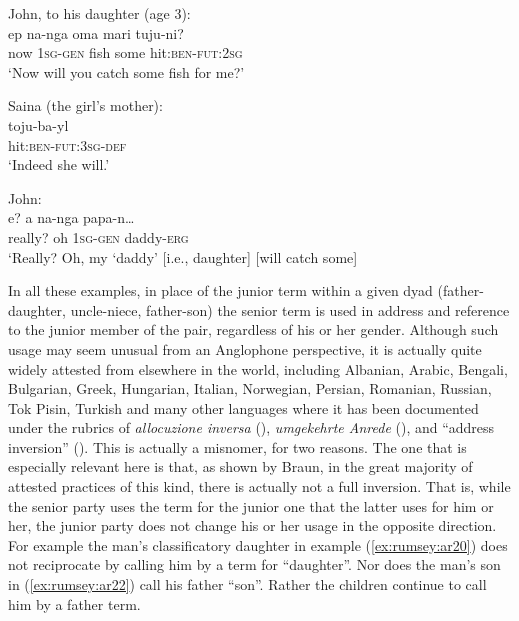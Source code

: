 \documentclass[output=paper]{langsci/langscibook}
\begin{document}
\begin{exe}
	\ex \label{ex:rumsey:ar23}
	\begin{xlist}
	\ex John, to his daughter (age 3):\label{ex:rumsey:ar23a}\\
	\gll ep na-nga oma mari tuju-ni?\\
	now 1\textsc{sg}-\textsc{gen} fish some hit:\textsc{ben}-\textsc{fut}:2\textsc{sg}\\
	\trans ‘Now will you catch some fish for me?’ 	
	
	\ex Saina (the girl’s mother):\label{ex:rumsey:ar23b}\\
	\gll toju-ba-yl\\
	hit:\textsc{ben}-\textsc{fut}:3\textsc{sg}-\textsc{def}\\
	\trans ‘Indeed she will.’
	
	\ex John:\label{ex:rumsey:ar23c}\\
	\gll e? a na-nga papa-n…\\
	really? oh 1\textsc{sg}-\textsc{gen} daddy-\textsc{erg}\\
	\trans ‘Really? Oh, my ‘daddy’ [i.e., daughter] [will catch some]
	\end{xlist}
\end{exe}

In all these examples, in place of the junior term within a given dyad (father-daughter, uncle-niece, father-son) the senior term is used in address and reference to the junior member of the pair, regardless of his or her gender. Although such usage may seem unusual from an Anglophone perspective, it is actually quite widely attested from elsewhere in the world, including Albanian, Arabic, Bengali, Bulgarian, Greek, Hungarian, Italian, Norwegian, Persian, Romanian, Russian, Tok Pisin, Turkish and many other languages where it has been documented under the rubrics of \textit{allocuzione inversa} (\citealt{Renzi1968}), \textit{umgekehrte Anrede} (\citealt{BeyerKostov1978}), and “address inversion” (\citealt{Braun1988}).  This is actually a misnomer, for two reasons.  The one that is especially relevant here is that, as shown by Braun, in the great majority of attested practices of this kind, there is actually not a full inversion. That is, while the senior party uses the term for the junior one that the latter uses for him or her, the junior party does not change his or her usage in the opposite direction. For example the man’s classificatory daughter in example (\ref{ex:rumsey:ar20}) does not reciprocate by calling him by a term for “daughter”. Nor does the man’s son in (\ref{ex:rumsey:ar22}) call his father “son”. Rather the children continue to call him by a father term. 
\end{document}
